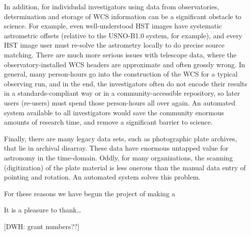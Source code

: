 \documentclass[12pt,preprint]{aastex}
\begin{document}
In addition, for individudal investigators using data from
observatories, determination and storage of WCS information can be a
significant obstacle to science.  For example, even well-understood
HST images have systematic astrometric offsets (relative to the
USNO-B1.0 system, for example), and every HST image user must re-solve
the astrometry locally to do precise source matching.  There are much
more serious issues with telescope data, where the
observatory-installed WCS headers are approximate and often grossly
wrong.  In general, many person-hours go into the construction of the
WCS for a typical observing run, and in the end, the investigators
often do not encode their results in a standards-compliant way or in a
community-accessible repository, so later users (re-users) must spend
those person-hours all over again.  An automated system available to
all investigators would save the community enormous amounts of
research time, and remove a significant barrier to science.

Finally, there are many legacy data sets, such as photographic plate
archives, that lie in archival disarray.  These data have enormous
untapped value for astronomy in the time-domain.  Oddly, for many
organizations, the scanning (digitization) of the plate material is
less onerous than the manual data entry of pointing and rotation.  An
automated system solves this problem.

For these reasons we have begun the project of making a

\acknowledgements
It is a pleasure to thank\ldots

[DWH: grant numbers??]
\end{document}
